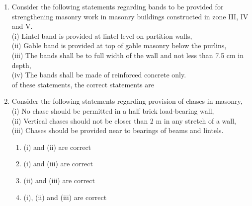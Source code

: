 \documentclass[11pt,a4paper]{article}
\begin{document}
\begin{enumerate}
{Select your answer according to the codes give below:}
\begin{enumerate}[label=\Alph*.]
\item{Both A and R is true and R is the correct explanation of A}
\item{Both A and R is true and R is not the correct explanation of A}
\item{A is true but R is false}
\item{A is false but R is true}
\end{enumerate}
\item{Consider the following statements regarding bands to be provided for strengthening masonry work in masonry buildings constructed in zone III, IV and V. \\
 (i) Lintel band is provided at lintel level on partition walls, \\
 (ii) Gable band is provided at top of gable masonry below the purlins, \\
 (iii) The bands shall be to full width of the wall and not less than 7.5 cm in depth, \\
 (iv) The bands shall be made of reinforced concrete only. \\
of these statements, the correct statements are}
\\
\item{Consider the following statements regarding provision of chases in masonry, \\
(i) No chase should be permitted in a half brick load-bearing wall, \\
(ii) Vertical chases should not be closer than 2 m in any stretch of a wall, \\
(iii) Chases should be provided near to bearings of beams and lintels.}
\begin{enumerate}[label=\Alph*.]
\item{(i) and (ii) are correct}
\item{(i) and (iii) are correct}
\item{(ii) and (iii) are correct}
\item{(i), (ii) and (iii) are correct}
\end{enumerate}

\end{enumerate}
\end{document}
